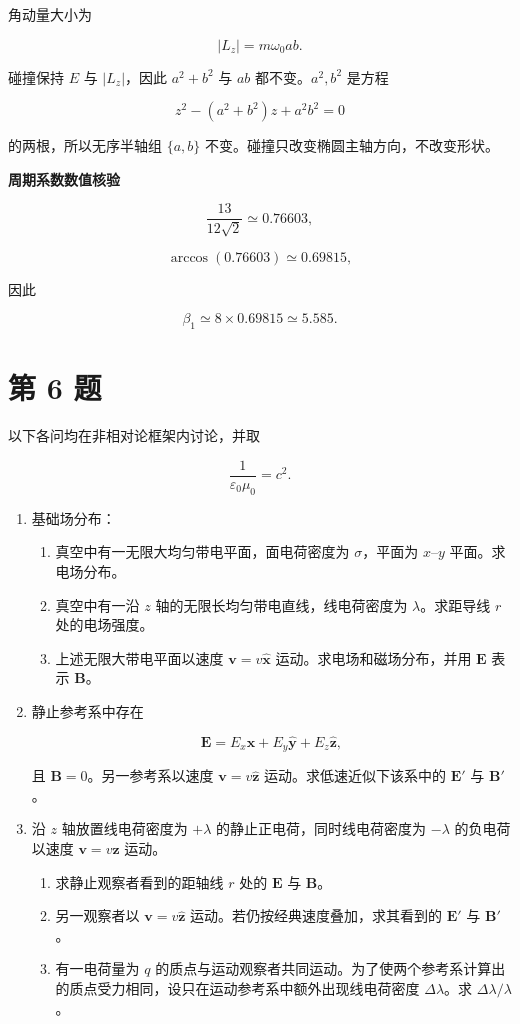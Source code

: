 \documentclass[12pt,a4paper,UTF8]{ctexart}
\newcommand{\tightlist}{\setlength{\itemsep}{0pt}\setlength{\parskip}{0pt}}
\begin{document}
角动量大小为

\[|L_z|=m\omega_0ab.\]

碰撞保持 \(E\) 与 \(|L_z|\)，因此 \(a^2+b^2\) 与 \(ab\)
都不变。\(a^2,b^2\) 是方程

\[z^2-(a^2+b^2)z+a^2b^2=0\]

的两根，所以无序半轴组 \(\{a,b\}\)
不变。碰撞只改变椭圆主轴方向，不改变形状。

\textbf{周期系数数值核验}

\[
\frac{13}{12\sqrt2}\simeq0.76603,
\]

\[
\arccos(0.76603)\simeq0.69815,
\]

因此

\[\beta_1\simeq8\times0.69815\simeq5.585.\]

\newpage

\section{第 6 题}\label{ux7b2c-6-ux9898}

以下各问均在非相对论框架内讨论，并取

\[\frac{1}{\varepsilon_0\mu_0}=c^2.\]

\begin{enumerate}
\def\labelenumi{\arabic{enumi}.}
\item
  基础场分布：

  \begin{enumerate}
  \def\labelenumii{\arabic{enumii}.}
  \tightlist
  \item
    真空中有一无限大均匀带电平面，面电荷密度为 \(\sigma\)，平面为
    \(x\)--\(y\) 平面。求电场分布。
  \item
    真空中有一沿 \(z\) 轴的无限长均匀带电直线，线电荷密度为
    \(\lambda\)。求距导线 \(r\) 处的电场强度。
  \item
    上述无限大带电平面以速度 \(\bm v=v\hat{\bm x}\)
    运动。求电场和磁场分布，并用 \(\bm E\) 表示 \(\bm B\)。
  \end{enumerate}
\item
  静止参考系中存在

  \[\bm E=E_x\hat{\bm x}+E_y\hat{\bm y}+E_z\hat{\bm z},\]

  且 \(\bm B=0\)。另一参考系以速度 \(\bm v=v\hat{\bm z}\)
  运动。求低速近似下该系中的 \(\bm E'\) 与 \(\bm B'\)。
\item
  沿 \(z\) 轴放置线电荷密度为 \(+\lambda\)
  的静止正电荷，同时线电荷密度为 \(-\lambda\) 的负电荷以速度
  \(\bm v=v\hat{\bm z}\) 运动。

  \begin{enumerate}
  \def\labelenumii{\arabic{enumii}.}
  \tightlist
  \item
    求静止观察者看到的距轴线 \(r\) 处的 \(\bm E\) 与 \(\bm B\)。
  \item
    另一观察者以 \(\bm v=v\hat{\bm z}\)
    运动。若仍按经典速度叠加，求其看到的 \(\bm E'\) 与 \(\bm B'\)。
  \item
    有一电荷量为 \(q\)
    的质点与运动观察者共同运动。为了使两个参考系计算出的质点受力相同，设只在运动参考系中额外出现线电荷密度
    \(\Delta\lambda\)。求 \(\Delta\lambda/\lambda\)。
  \end{enumerate}
\end{enumerate}
\end{document}
